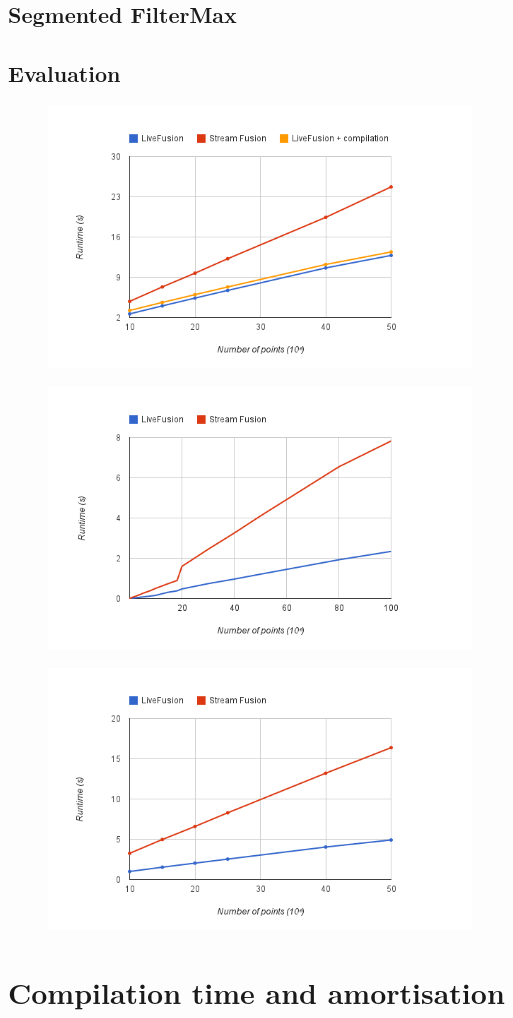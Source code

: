 \documentclass[preamble.tex]{subfiles}
\begin{document}
\subsection{Segmented FilterMax}

\subsection{Evaluation}

\begin{figure}
\includegraphics[center]{img/Eval-QuickHull}
\end{figure}

\begin{figure}
\includegraphics[center]{img/Eval-FarAndAboves}
\end{figure}

\begin{figure}
\includegraphics[center]{img/Eval-FarAndAboves-Overall}
\end{figure}

\clearpage
\section{Compilation time and amortisation}


\IfNotCompilingAll{}
\end{document}

